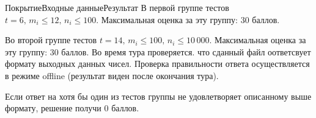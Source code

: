 \begin{problem}{Покрытие}{Входные данные}{Результат}{}
В первой группе тестов $t = 6,\, m_i \leqslant 12,\, n_i \leqslant 100$. Максимальная оценка за эту группу: $30$ баллов. 

Во второй группе тестов $t = 14,\, m_i \leqslant 100,\, n_i \leqslant 10\,000$. Максимальная оценка за эту группу: $30$ баллов. Во время тура проверяется. что сданный файл оответсвует формату выходных данных чисел. Проверка правильности ответа осуществляется в режиме offline (результат виден после окончания тура).

Если ответ на хотя бы один из тестов группы не удовлетворяет описанному выше формату, решение получи 0 баллов.

\end{problem} 
